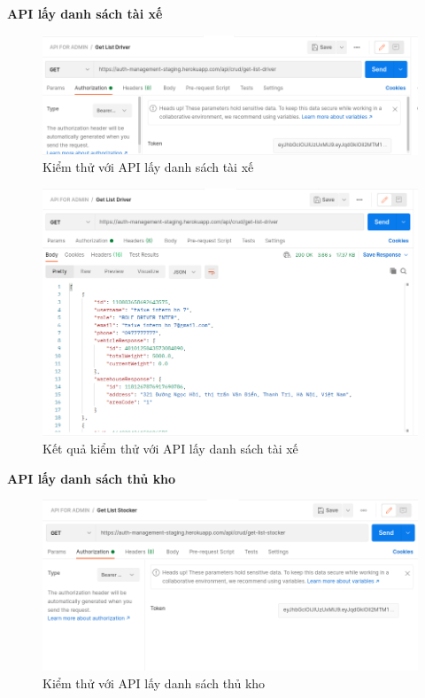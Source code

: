 		\newpage
		\textbf{API lấy danh sách tài xế}
		
		\begin{figure}[H]
			\includegraphics[width=1\textwidth]{Images/testing/API-get-list-drivers.png}
			\centering
			\linebreak
			\caption{Kiểm thử với API lấy danh sách tài xế}
		\end{figure}
		
		\begin{figure}[H]
			\includegraphics[width=1\textwidth]{Images/testing/API-get-list-drivers-result.png}
			\centering
			\linebreak
			\caption{Kết quả kiểm thử với API lấy danh sách tài xế}
		\end{figure}
		
		\newpage
		\textbf{API lấy danh sách thủ kho}
		
		\begin{figure}[H]
			\includegraphics[width=1\textwidth]{Images/testing/API-get-list-stocker.png}
			\centering
			\linebreak
			\caption{Kiểm thử với API lấy danh sách thủ kho}
		\end{figure}
		
